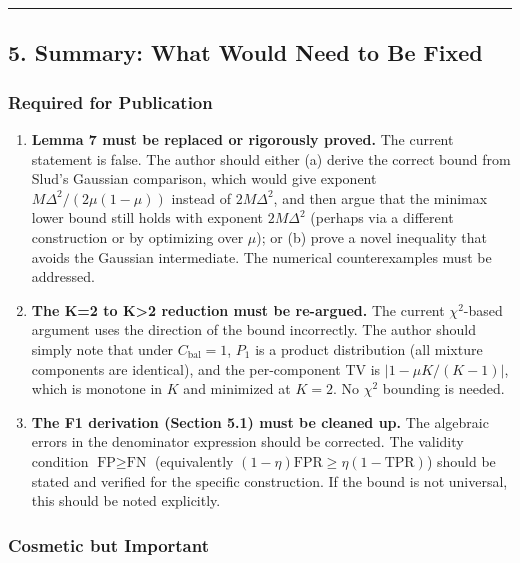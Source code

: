\documentclass[
  12pt,
]{article}
\begin{document}
\begin{center}\rule{0.5\linewidth}{0.5pt}\end{center}

\subsection{5. Summary: What Would Need to Be
Fixed}\label{summary-what-would-need-to-be-fixed}

\subsubsection{Required for Publication}\label{required-for-publication}

\begin{enumerate}
\def\labelenumi{\arabic{enumi}.}
\item
  \textbf{Lemma 7 must be replaced or rigorously proved.} The current
  statement is false. The author should either (a) derive the correct
  bound from Slud's Gaussian comparison, which would give exponent
  \(M\Delta^2/(2\mu(1-\mu))\) instead of \(2M\Delta^2\), and then argue
  that the minimax lower bound still holds with exponent \(2M\Delta^2\)
  (perhaps via a different construction or by optimizing over \(\mu\));
  or (b) prove a novel inequality that avoids the Gaussian intermediate.
  The numerical counterexamples must be addressed.
\item
  \textbf{The K=2 to K\textgreater2 reduction must be re-argued.} The
  current \(\chi^2\)-based argument uses the direction of the bound
  incorrectly. The author should simply note that under
  \(C_{\text{bal}}=1\), \(P_1\) is a product distribution (all mixture
  components are identical), and the per-component TV is
  \(|1-\mu K/(K-1)|\), which is monotone in \(K\) and minimized at
  \(K=2\). No \(\chi^2\) bounding is needed.
\item
  \textbf{The F1 derivation (Section 5.1) must be cleaned up.} The
  algebraic errors in the denominator expression should be corrected.
  The validity condition \(\text{FP} \geq \text{FN}\) (equivalently
  \((1-\eta)\text{FPR} \geq \eta(1-\text{TPR})\)) should be stated and
  verified for the specific construction. If the bound is not universal,
  this should be noted explicitly.
\end{enumerate}

\subsubsection{Cosmetic but Important}\label{cosmetic-but-important}
\end{document}
